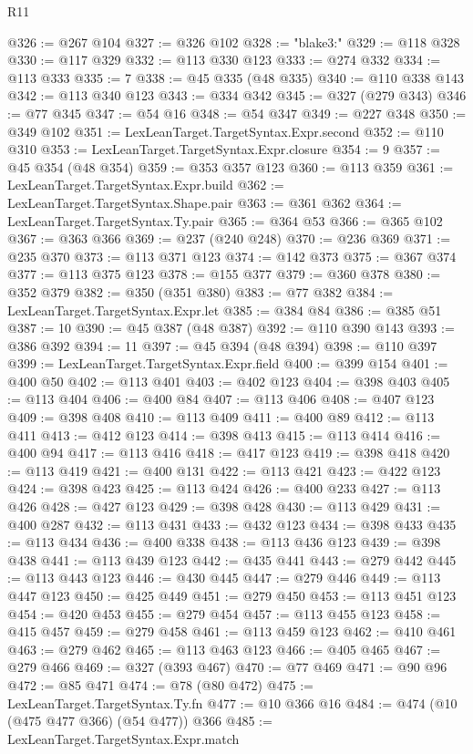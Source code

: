 \begin{lexlean}{R11}
\begin{coremodule}
{{{{{{{{{{{{{{{{{{{{{{{{{{{{{{{{{{{{{{{{{{{{{{{{{{{{{{{{{{{{{{{{{{{{{{{{{{{{{{{{{{{{{{{{{{{{{{{{{{{{{{{{{{@326 := @267 @104
@327 := @326 @102
@328 := "blake3:"
@329 := @118 @328
@330 := @117 @329
@332 := @113 @330 @123
@333 := @274 @332
@334 := @113 @333
@335 := 7
@338 := @45 @335 (@48 @335)
@340 := @110 @338 @143
@342 := @113 @340 @123
@343 := @334 @342
@345 := @327 (@279 @343)
@346 := @77 @345
@347 := @54 @16
@348 := @54 @347
@349 := @227 @348
@350 := @349 @102
@351 := LexLeanTarget.TargetSyntax.Expr.second
@352 := @110 @310
@353 := LexLeanTarget.TargetSyntax.Expr.closure
@354 := 9
@357 := @45 @354 (@48 @354)
@359 := @353 @357 @123
@360 := @113 @359
@361 := LexLeanTarget.TargetSyntax.Expr.build
@362 := LexLeanTarget.TargetSyntax.Shape.pair
@363 := @361 @362
@364 := LexLeanTarget.TargetSyntax.Ty.pair
@365 := @364 @53
@366 := @365 @102
@367 := @363 @366
@369 := @237 (@240 @248)
@370 := @236 @369
@371 := @235 @370
@373 := @113 @371 @123
@374 := @142 @373
@375 := @367 @374
@377 := @113 @375 @123
@378 := @155 @377
@379 := @360 @378
@380 := @352 @379
@382 := @350 (@351 @380)
@383 := @77 @382
@384 := LexLeanTarget.TargetSyntax.Expr.let
@385 := @384 @84
@386 := @385 @51
@387 := 10
@390 := @45 @387 (@48 @387)
@392 := @110 @390 @143
@393 := @386 @392
@394 := 11
@397 := @45 @394 (@48 @394)
@398 := @110 @397
@399 := LexLeanTarget.TargetSyntax.Expr.field
@400 := @399 @154
@401 := @400 @50
@402 := @113 @401
@403 := @402 @123
@404 := @398 @403
@405 := @113 @404
@406 := @400 @84
@407 := @113 @406
@408 := @407 @123
@409 := @398 @408
@410 := @113 @409
@411 := @400 @89
@412 := @113 @411
@413 := @412 @123
@414 := @398 @413
@415 := @113 @414
@416 := @400 @94
@417 := @113 @416
@418 := @417 @123
@419 := @398 @418
@420 := @113 @419
@421 := @400 @131
@422 := @113 @421
@423 := @422 @123
@424 := @398 @423
@425 := @113 @424
@426 := @400 @233
@427 := @113 @426
@428 := @427 @123
@429 := @398 @428
@430 := @113 @429
@431 := @400 @287
@432 := @113 @431
@433 := @432 @123
@434 := @398 @433
@435 := @113 @434
@436 := @400 @338
@438 := @113 @436 @123
@439 := @398 @438
@441 := @113 @439 @123
@442 := @435 @441
@443 := @279 @442
@445 := @113 @443 @123
@446 := @430 @445
@447 := @279 @446
@449 := @113 @447 @123
@450 := @425 @449
@451 := @279 @450
@453 := @113 @451 @123
@454 := @420 @453
@455 := @279 @454
@457 := @113 @455 @123
@458 := @415 @457
@459 := @279 @458
@461 := @113 @459 @123
@462 := @410 @461
@463 := @279 @462
@465 := @113 @463 @123
@466 := @405 @465
@467 := @279 @466
@469 := @327 (@393 @467)
@470 := @77 @469
@471 := @90 @96
@472 := @85 @471
@474 := @78 (@80 @472)
@475 := LexLeanTarget.TargetSyntax.Ty.fn
@477 := @10 @366 @16
@484 := @474 (@10 (@475 @477 @366) (@54 @477)) @366
@485 := LexLeanTarget.TargetSyntax.Expr.match
}}}}}}}}}}}}}}}}}}}}}}}}}}}}}}}}}}}}}}}}}}}}}}}}}}}}}}}}}}}}}}}}}}}}}}}}}}}}}}}}}}}}}}}}}}}}}}}}}}}}}}}}}}
\end{coremodule}
\end{lexlean}
